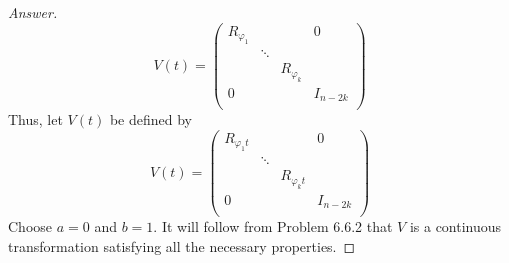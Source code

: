 \documentclass[../psets.tex]{subfiles}
\begin{document}
\begin{enumerate}[label={\textbf{6.\arabic*.}}]
\begin{proof}[Answer]
        \begin{equation*}
            V(t) =
            \begin{pmatrix}
                R_{\varphi_1} &  &  & 0\\
                 & \ddots &  & \\
                 &  & R_{\varphi_k} & \\
                0 &  &  & I_{n-2k}\\
            \end{pmatrix}
        \end{equation*}
        Thus, let $V(t)$ be defined by
        \begin{equation*}
            V(t) =
            \begin{pmatrix}
                R_{\varphi_1t} &  &  & 0\\
                 & \ddots &  & \\
                 &  & R_{\varphi_kt} & \\
                0 &  &  & I_{n-2k}\\
            \end{pmatrix}
        \end{equation*}
        Choose $a=0$ and $b=1$. It will follow from Problem 6.6.2 that $V$ is a continuous transformation satisfying all the necessary properties.
    \end{proof}
\end{enumerate}
\end{document}
